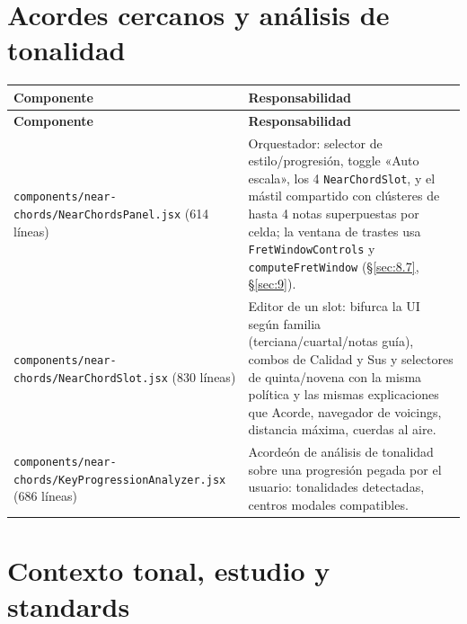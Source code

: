 \documentclass[a4paper,11pt,oneside]{report}
\newcommand{\Sref}[1]{\S\ref{#1}}
\begin{document}
\section{Acordes cercanos y análisis de tonalidad}
\label{sec:5.4}

\begin{center}
\begin{longtable}{L{5.0cm}L{9.3cm}}
\toprule
{}\textbf{Componente} & \textbf{Responsabilidad}\\
\midrule
\endfirsthead
{}\textbf{Componente} & \textbf{Responsabilidad}\\
\midrule
\endhead
\bottomrule
\endlastfoot
\lstinline!components/near-chords/NearChordsPanel.jsx! (614 líneas) & Orquestador: selector de estilo/progresión, toggle «Auto escala», los 4 \lstinline!NearChordSlot!, y el mástil compartido con clústeres de hasta 4 notas superpuestas por celda; la ventana de trastes usa \lstinline!FretWindowControls! y \lstinline!computeFretWindow! (\Sref{sec:8.7}, \Sref{sec:9}).\\
\lstinline!components/near-chords/NearChordSlot.jsx! (830 líneas) & Editor de un slot: bifurca la UI según familia (terciana/cuartal/notas guía), combos de Calidad y Sus y selectores de quinta/novena con la misma política y las mismas explicaciones que Acorde, navegador de voicings, distancia máxima, cuerdas al aire.\\
\lstinline!components/near-chords/KeyProgressionAnalyzer.jsx! (686 líneas) & Acordeón de análisis de tonalidad sobre una progresión pegada por el usuario: tonalidades detectadas, centros modales compatibles.\\
\end{longtable}
\end{center}

\section{Contexto tonal, estudio y standards}
\label{sec:5.5}
\end{document}
